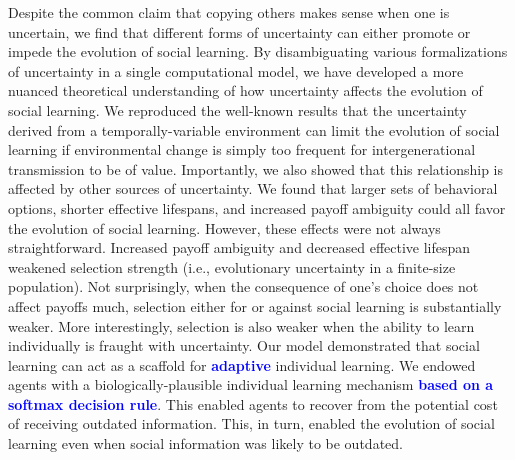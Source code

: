 \documentclass[letterpaper,11.5pt]{scrartcl}
\newcommand{\cm}[1]{{\textcolor{mypurple} {({\tiny CM:} #1)}}}
\newcommand{\edit}[1]{{\bfseries \textcolor{blue} {#1}}}
\begin{document}
 Despite the common claim that copying others makes sense when one is uncertain, we find that different forms of uncertainty can
 either promote or impede the evolution of social learning. By disambiguating various formalizations of uncertainty in a single
 computational model, we have developed a more nuanced theoretical understanding of how uncertainty affects the evolution of social learning. %
We reproduced the well-known results that the uncertainty derived from a temporally-variable environment can limit the evolution of social learning if environmental change is simply too frequent for intergenerational transmission to be of value. Importantly, we also showed that this relationship is affected by other sources of uncertainty. 
We found that larger sets of behavioral options, shorter effective lifespans,
and increased payoff ambiguity could all favor the evolution of social learning.
However, these effects were not always straightforward. Increased payoff
ambiguity and decreased effective lifespan weakened selection strength
(i.e., evolutionary uncertainty in a finite-size population). Not surprisingly,
when the consequence of one's choice does not affect payoffs much, selection
either for or against social learning is substantially weaker. More
interestingly, selection is also weaker when the ability to learn individually
is fraught with uncertainty. Our model demonstrated that social learning can act
as a scaffold for \edit{adaptive} individual learning. We endowed agents with a
biologically-plausible individual learning mechanism \edit{based on a softmax decision rule}. This
enabled agents to recover from the potential cost of receiving outdated
information. This, in turn, enabled the evolution of social learning even when
social information was likely to be outdated. 

\end{document}
